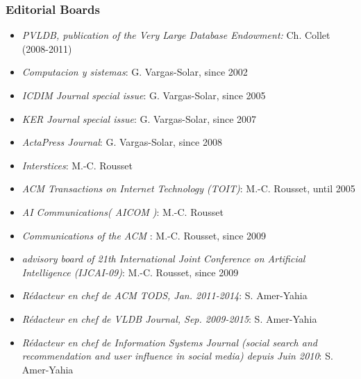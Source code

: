 \subsubsection*{Editorial Boards}

\begin{itemize}
\setlength{\itemindent}{-0.5cm}
\setlength{\itemsep}{-0.1cm}
\item {\it PVLDB, publication of the Very Large Database Endowment:} Ch. Collet (2008-2011)

\item {\it Computacion y sistemas}: G. Vargas-Solar, since 2002

\item {\it ICDIM Journal special issue}: G. Vargas-Solar, since 2005

\item {\it KER Journal special issue}: G. Vargas-Solar, since 2007

\item {\it ActaPress Journal}: G. Vargas-Solar, since 2008

\item {\it Interstices}: M.-C. Rousset

\item {\it ACM Transactions on Internet Technology (TOIT)}: M.-C. Rousset,  until 2005

\item {\it AI Communications( AICOM )}: M.-C. Rousset

\item {\it Communications of the ACM }: M.-C. Rousset,  since 2009

\item {\it advisory board of 21th International Joint Conference on Artificial Intelligence (IJCAI-09)}: M.-C. Rousset,  since 2009

\item \emph{R\'edacteur en chef de ACM TODS, Jan. 2011-2014}:  S. Amer-Yahia

\item \emph{R\'edacteur en chef de VLDB Journal, Sep. 2009-2015}:  S. Amer-Yahia

\item \emph{R\'edacteur en chef de Information Systems Journal (social search and recommendation and user influence in social media) depuis Juin 2010}:  S. Amer-Yahia
    


\end{itemize}


